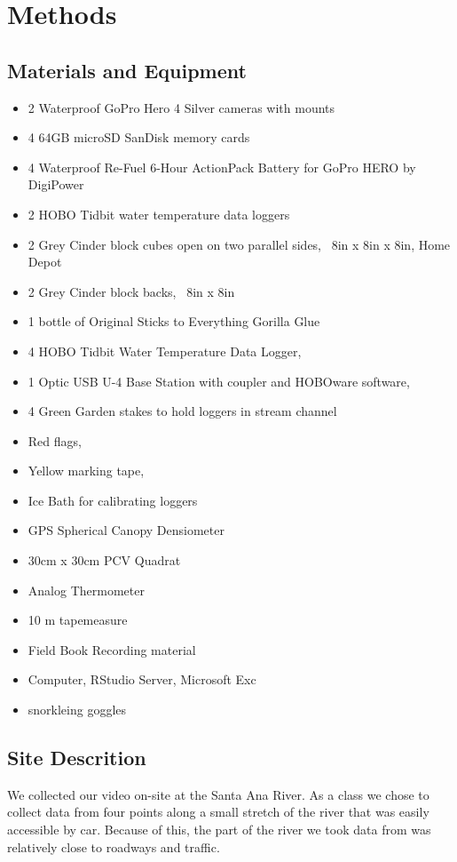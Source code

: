\documentclass{article}\usepackage[]{graphicx}\usepackage[]{color}
\begin{document}
\section{Methods}

\subsection{Materials and Equipment}
\begin{itemize}
\item 2 Waterproof GoPro Hero 4 Silver cameras with mounts
\item 4 64GB microSD SanDisk memory cards
\item 4 Waterproof Re-Fuel 6-Hour ActionPack Battery for GoPro HERO by DigiPower
\item 2 HOBO Tidbit water temperature data loggers
\item 2 Grey Cinder block cubes open on two parallel sides, ~8in x 8in x 8in, Home Depot
\item 2 Grey Cinder block backs, ~8in x 8in
\item 1 bottle of Original Sticks to Everything Gorilla Glue
\item 4 HOBO Tidbit Water Temperature Data Logger,
\item 1 Optic USB U-4 Base Station with coupler and HOBOware software,
\item 4 Green Garden stakes to hold loggers in stream channel
\item Red flags,
\item Yellow marking tape,
\item Ice Bath for calibrating loggers
\item GPS Spherical Canopy Densiometer
\item 30cm x 30cm PCV Quadrat
\item Analog Thermometer
\item 10 m tapemeasure
\item Field Book Recording material
\item Computer, RStudio Server, Microsoft Exc
\item snorkleing goggles 

\end{itemize}

\subsection{Site Descrition}

We collected our video on-site at the Santa Ana River. As a class we chose to collect data from four points along a small stretch of the river that was easily accessible by car. Because of this, the part of the river we took data from was relatively close to roadways and traffic. 
\end{document}
